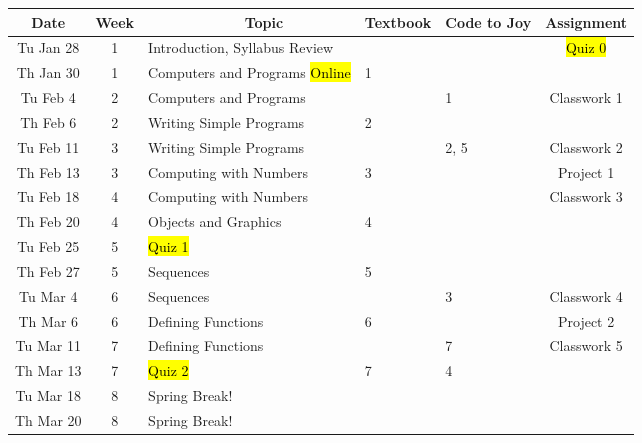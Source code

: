 \documentclass[letter,10pt]{article}
\begin{document}
\begin{comment}
M Nov 25  & 14 & Object Oriented Design & & & Classwork 9 \\
W Nov 27  & 14 & Algorithm Design \& Recursion & & & \\ \hline
M Dec 2   & 15 & Algorithm Design \& Recursion & 13 & & \\
W Dec 4   & 15 & \hl{Quiz 4} \textit{Updated 11/20} & & 9 & Classwork 10 \\
M Dec 9   & 16 & Review & & & \\
W Dec 11  & 16 & \hl{Study Day, no class} & & & \\
M Dec 16  & 17 & \hl{Final Exam, 6-8PM.} & & & \\
\end{tabular}
\end{comment}

\small
\begin{tabular}{c c l l l c}
Date           & Week & ~~~~~~~~~~~~Topic & Textbook & Code to Joy & Assignment \\ \hline
Tu Jan 28  & 1  & Introduction, Syllabus Review & & & \hl{Quiz 0} \\
Th Jan 30  & 1  & Computers and Programs \hl{Online} & 1 & & \\ \hline
Tu Feb 4    & 2  & Computers and Programs & & 1 & Classwork 1 \\
Th Feb 6    & 2  & Writing Simple Programs & 2 & & \\
Tu Feb 11  & 3  & Writing Simple Programs & & 2, 5 & Classwork 2 \\
Th Feb 13  & 3  & Computing with Numbers & 3 & & Project 1\\
Tu Feb 18  & 4  & Computing with Numbers & & & Classwork 3 \\
Th Feb 20  & 4  & Objects and Graphics & 4 & & \\
Tu Feb 25  & 5  & \hl{Quiz 1} & & & \\
Th Feb 27  & 5  & Sequences & 5 & & \\ \hline
Tu Mar 4    & 6  & Sequences & & 3 & Classwork 4 \\
Th Mar 6    & 6  & Defining Functions & 6 & & Project 2\\
Tu Mar 11  & 7  & Defining Functions & & 7 & Classwork 5 \\
Th Mar 13  & 7  & \hl{Quiz 2} & 7 & 4 & \\
Tu Mar 18  & 8  & {\color{cadmiumgreen}Spring Break!} & & & \\
Th Mar 20  & 8  & {\color{cadmiumgreen}Spring Break!} & & & \\

\end{tabular}
\end{document}
